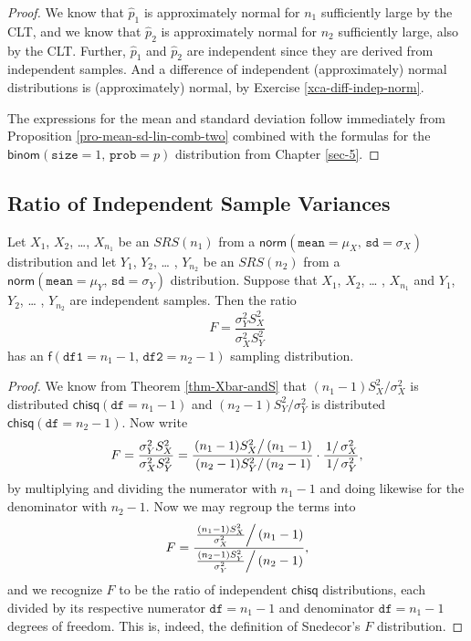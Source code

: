 \begin{proof}
We know that \(\hat{p}_{1}\) is approximately normal for \(n_{1}\)
sufficiently large by the CLT, and we know that \(\hat{p}_{2}\) is
approximately normal for \(n_{2}\) sufficiently large, also by the
CLT. Further, \(\hat{p}_{1}\) and \(\hat{p}_{2}\) are independent
since they are derived from independent samples. And a difference of
independent (approximately) normal distributions is (approximately)
normal, by Exercise \ref{xca-diff-indep-norm}.

The expressions for the mean and standard deviation follow immediately
from Proposition \ref{pro-mean-sd-lin-comb-two} combined with the formulas
for the \(\mathsf{binom}(\mathtt{size}=1,\,\mathtt{prob}=p)\)
distribution from Chapter \ref{sec-5}.
\end{proof}

\subsection{Ratio of Independent Sample Variances}
\label{sec-8-4-3}

\begin{prop}
Let \(X_{1}\), \(X_{2}\), \ldots{}, \(X_{n_{1}}\) be an \(SRS(n_{1})\) from
a \(\mathsf{norm}(\mathtt{mean}=\mu_{X},\,\mathtt{sd}=\sigma_{X})\)
distribution and let \(Y_{1}\), \(Y_{2}\), \ldots{} , \(Y_{n_{2}}\) be an
\(SRS(n_{2})\) from a
\(\mathsf{norm}(\mathtt{mean}=\mu_{Y},\,\mathtt{sd}=\sigma_{Y})\)
distribution. Suppose that \(X_{1}\), \(X_{2}\), \ldots{} , \(X_{n_{1}}\)
and \(Y_{1}\), \(Y_{2}\), \ldots{} , \(Y_{n_{2}}\) are independent
samples. Then the ratio
\begin{equation}
F=\frac{\sigma_{Y}^{2}S_{X}^{2}}{\sigma_{X}^{2}S_{Y}^{2}}
\end{equation}
has an \(\mathsf{f}(\mathtt{df1}=n_{1}-1,\,\mathtt{df2}=n_{2}-1)\)
sampling distribution.
\end{prop}

\begin{proof}
We know from Theorem \ref{thm-Xbar-andS} that
\((n_{1}-1)S_{X}^{2}/\sigma_{X}^{2}\) is distributed
\(\mathsf{chisq}(\mathtt{df}=n_{1}-1)\) and
\((n_{2}-1)S_{Y}^{2}/\sigma_{Y}^{2}\) is distributed
\(\mathsf{chisq}(\mathtt{df}=n_{2}-1)\). Now write \[
F=\frac{\sigma_{Y}^{2}S_{X}^{2}}{\sigma_{X}^{2}S_{Y}^{2}}=\frac{\left.(n_{1}-1)S_{X}^{2}\right/
(n_{1}-1)}{\left.(n_{2}-1)S_{Y}^{2}\right/
(n_{2}-1)}\cdot\frac{\left.1\right/ \sigma_{X}^{2}}{\left.1\right/
\sigma_{Y}^{2}}, \] by multiplying and dividing the numerator with
\(n_{1}-1\) and doing likewise for the denominator with
\(n_{2}-1\). Now we may regroup the terms into \[
F=\frac{\left.\frac{(n_{1}-1)S_{X}^{2}}{\sigma_{X}^{2}}\right/
(n_{1}-1)}{\left.\frac{(n_{2}-1)S_{Y}^{2}}{\sigma_{Y}^{2}}\right/
(n_{2}-1)}, \] and we recognize \(F\) to be the ratio of independent
\(\mathsf{chisq}\) distributions, each divided by its respective
numerator \(\mathtt{df}=n_{1}-1\) and denominator
\(\mathtt{df}=n_{1}-1\) degrees of freedom. This is, indeed, the
definition of Snedecor's \(F\) distribution.
\end{proof}

